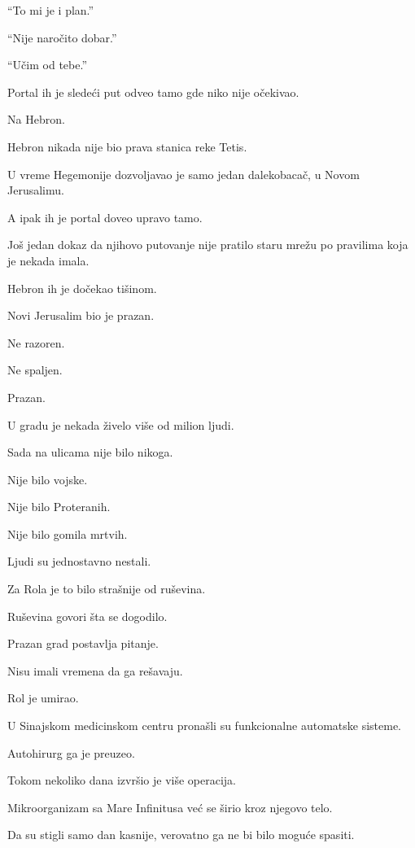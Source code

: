 ``To mi je i plan.''

``Nije naročito dobar.''

``Učim od tebe.''

\bigskip

Portal ih je sledeći put odveo tamo gde niko nije očekivao.

Na Hebron.

\bigskip

Hebron nikada nije bio prava stanica reke Tetis.

U vreme Hegemonije dozvoljavao je samo jedan dalekobacač, u Novom Jerusalimu.

A ipak ih je portal doveo upravo tamo.

Još jedan dokaz da njihovo putovanje nije pratilo staru mrežu po pravilima koja je nekada imala.

\bigskip

Hebron ih je dočekao tišinom.

\bigskip

Novi Jerusalim bio je prazan.

Ne razoren.

Ne spaljen.

Prazan.

\bigskip

U gradu je nekada živelo više od milion ljudi.

Sada na ulicama nije bilo nikoga.

Nije bilo vojske.

Nije bilo Proteranih.

Nije bilo gomila mrtvih.

Ljudi su jednostavno nestali.

\bigskip

Za Rola je to bilo strašnije od ruševina.

Ruševina govori šta se dogodilo.

Prazan grad postavlja pitanje.

\bigskip

Nisu imali vremena da ga rešavaju.

Rol je umirao.

U Sinajskom medicinskom centru pronašli su funkcionalne automatske sisteme.

Autohirurg ga je preuzeo.

Tokom nekoliko dana izvršio je više operacija.

Mikroorganizam sa Mare Infinitusa već se širio kroz njegovo telo.

Da su stigli samo dan kasnije, verovatno ga ne bi bilo moguće spasiti.

